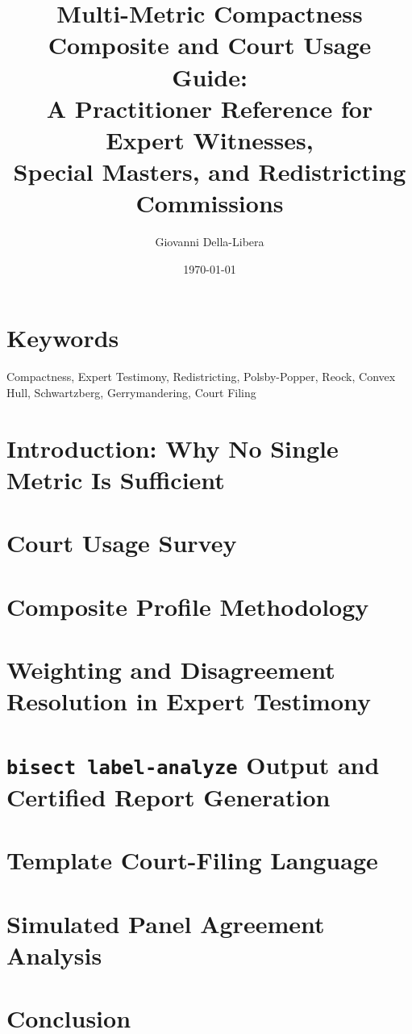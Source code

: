 \documentclass[12pt]{article}
\title{\textbf{Multi-Metric Compactness Composite and Court Usage Guide:\\
A Practitioner Reference for Expert Witnesses,\\
Special Masters, and Redistricting Commissions}}
\author{Giovanni Della-Libera}
\date{\today}
\begin{document}
\maketitle

\begin{abstract}

\end{abstract}

\section*{Keywords}
Compactness, Expert Testimony, Redistricting, Polsby-Popper, Reock,
Convex Hull, Schwartzberg, Gerrymandering, Court Filing

\section{Introduction: Why No Single Metric Is Sufficient}


\section{Court Usage Survey}


\section{Composite Profile Methodology}


\section{Weighting and Disagreement Resolution in Expert Testimony}


\section{\texttt{bisect label-analyze} Output and Certified Report Generation}


\section{Template Court-Filing Language}


\section{Simulated Panel Agreement Analysis}


\section{Conclusion}




\end{document}
